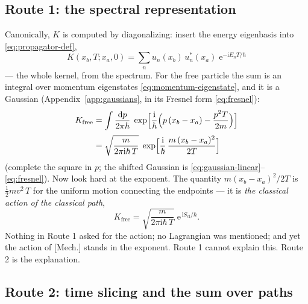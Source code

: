 \documentclass[11pt]{article}
\theoremstyle{plain}
\theoremstyle{definition}
\theoremstyle{remark}
\newcommand{\dd}{\mathrm{d}}
\newcommand{\ee}{\mathrm{e}}
\newcommand{\ii}{\mathrm{i}}
\begin{document}
\subsection{Route 1: the spectral representation}
\label{sec:spectral-route}

Canonically, $K$ is computed by diagonalizing: insert the energy
eigenbasis into \eqref{eq:propagator-def},
\begin{equation}
  K(x_b, T; x_a, 0)
  = \sum_n
    u_n(x_b)\,u_n^{*}(x_a)\;
    \ee^{-\ii E_n T/\hbar}
  \label{eq:spectral-rep}
\end{equation}
--- the whole kernel, from the spectrum. For the free particle the
sum is an integral over momentum eigenstates
\eqref{eq:momentum-eigenstate}, and it is a Gaussian
(Appendix~\ref{app:gaussians}, in its Fresnel form
\eqref{eq:fresnel}):
\begin{align}
  K_{\text{free}}
  &= \int\frac{\dd p}{2\pi\hbar}\;
    \exp\Bigl[
      \frac{\ii}{\hbar}\Bigl(
        p\,(x_b - x_a) - \frac{p^2 T}{2m}
      \Bigr)
    \Bigr]
  \notag\\[2pt]
  &= \sqrt{\frac{m}{2\pi\ii\hbar\, T}}\;
    \exp\Bigl[
      \frac{\ii}{\hbar}\,
      \frac{m\,(x_b - x_a)^2}{2T}
    \Bigr]
  \label{eq:free-propagator}
\end{align}
(complete the square in $p$; the shifted Gaussian is
\eqref{eq:gaussian-linear}--\eqref{eq:fresnel}). Now look hard at
the exponent. The quantity $m(x_b - x_a)^2/2T$ is
$\tfrac12 m v^2\, T$ for the uniform motion connecting the
endpoints --- it is \emph{the classical action of the classical
path},
\begin{equation}
  K_{\text{free}}
  = \sqrt{\frac{m}{2\pi\ii\hbar\, T}}\;
    \ee^{\,\ii S_{\text{cl}}/\hbar} .
  \label{eq:free-Scl}
\end{equation}
Nothing in Route 1 asked for the action; no Lagrangian was
mentioned; and yet the action of [Mech.] stands in the exponent.
Route 1 cannot explain this. Route 2 is the
explanation.

\subsection{Route 2: time slicing and the sum over paths}
\label{sec:time-slicing}
\end{document}
